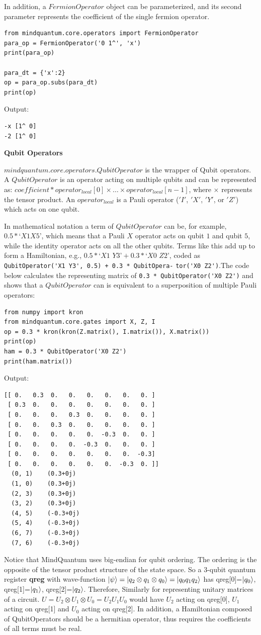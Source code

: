 In addition, a $FermionOperator$ object can be parameterized, and its second parameter represents the coefficient of the single fermion operator.

\begin{lstlisting}
from mindquantum.core.operators import FermionOperator
para_op = FermionOperator('0 1^', 'x')
print(para_op)

para_dt = {'x':2}
op = para_op.subs(para_dt)
print(op)
\end{lstlisting}
Output:
\begin{lstlisting}
-x [1^ 0]
-2 [1^ 0]
\end{lstlisting}

\textbf{Qubit Operators}

$mindquantum.core.operators.QubitOperator$ is the wrapper of Qubit operators. A $QubitOperator$ is an operator acting on multiple qubits and can be represented as: $coefficient * operator_{local}[0] × … × operator_{local}[n-1]$, where $×$ represents the tensor product. An $operator_{local}$ is a Pauli operator ($'I'$, $'X'$, $'Y'$, or $'Z'$) which acts on one qubit.

In mathematical notation a term of $QubitOperator$ can be, for example, $0.5 * ‘X1 X5’$, which means that a Pauli $X$ operator acts on qubit $1$ and qubit $5$, while the identity operator acts on all the other qubits. Terms like this add up to form a Hamiltonian, e.g., $0.5 * ‘X1$ $Y3’ + 0.3 * ‘X0$ $Z2’$, coded as \verb|QubitOperator('X1 Y3', 0.5) + 0.3 * QubitOpera-| \verb|tor('X0 Z2')|.The code below calculates the representing matrix of \verb|0.3 * QubitOperator('X0 Z2')| and shows that a $QubitOperator$ can is equivalent to a superposition of multiple Pauli operators:
\begin{lstlisting}
from numpy import kron
from mindquantum.core.gates import X, Z, I
op = 0.3 * kron(kron(Z.matrix(), I.matrix()), X.matrix())
print(op)
ham = 0.3 * QubitOperator('X0 Z2')
print(ham.matrix())
\end{lstlisting}
Output:
\begin{lstlisting}
[[ 0.   0.3  0.   0.   0.   0.   0.   0. ]
 [ 0.3  0.   0.   0.   0.   0.   0.   0. ]
 [ 0.   0.   0.   0.3  0.   0.   0.   0. ]
 [ 0.   0.   0.3  0.   0.   0.   0.   0. ]
 [ 0.   0.   0.   0.   0.  -0.3  0.   0. ]
 [ 0.   0.   0.   0.  -0.3  0.   0.   0. ]
 [ 0.   0.   0.   0.   0.   0.   0.  -0.3]
 [ 0.   0.   0.   0.   0.   0.  -0.3  0. ]]
  (0, 1)	(0.3+0j)
  (1, 0)	(0.3+0j)
  (2, 3)	(0.3+0j)
  (3, 2)	(0.3+0j)
  (4, 5)	(-0.3+0j)
  (5, 4)	(-0.3+0j)
  (6, 7)	(-0.3+0j)
  (7, 6)	(-0.3+0j)
\end{lstlisting}
Notice that MindQuantum uses big-endian for qubit ordering. The ordering is the opposite of the tensor product structure of the state space. So a 3-qubit quantum register \textbf{qreg} with wave-function $\ket{\psi}=\ket{q_2\otimes q_1 \otimes q_0}=\ket{q_0 q_1 q_2}$  has qreg[0]=$\ket{q_0}$, qreg[1]=$\ket{q_1}$, qreg[2]=$\ket{q_2}$. Therefore, Similarly for representing unitary matrices of a circuit. $U=U_2 \otimes{U_1}\otimes{U_0}=U_2 U_1 U_0$ would have $U_2$ acting on qreg[0], $U_1$ acting on qreg[1] and $U_0$ acting on qreg[2]. In addition, a Hamiltonian composed of QubitOperators should be a hermitian operator, thus requires the coefficients of all terms must be real.

